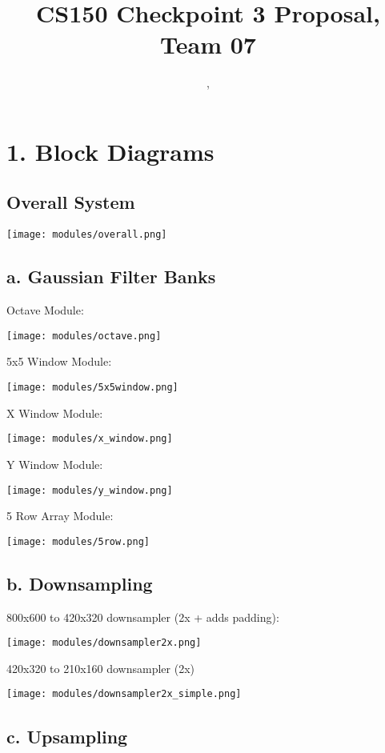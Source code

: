 \documentclass[11pt]{article}
\title{CS150 Checkpoint 3 Proposal, Team 07}
\author{\Name, \texttt{\Login}}
\begin{document}
\maketitle
\section*{1. Block Diagrams}

\subsection*{Overall System}

\noindent\texttt{[image: modules/overall.png]}

\subsection*{a. Gaussian Filter Banks}

Octave Module:

\noindent\texttt{[image: modules/octave.png]}

5x5 Window Module:

\noindent\texttt{[image: modules/5x5window.png]}

X Window Module:

\noindent\texttt{[image: modules/x\_window.png]}

Y Window Module:

\noindent\texttt{[image: modules/y\_window.png]}

5 Row Array Module:

\noindent\texttt{[image: modules/5row.png]}

\subsection*{b. Downsampling}

800x600 to 420x320 downsampler (2x + adds padding):

\noindent\texttt{[image: modules/downsampler2x.png]}

420x320 to 210x160 downsampler (2x)

\noindent\texttt{[image: modules/downsampler2x\_simple.png]}

\subsection*{c. Upsampling}
\end{document}
